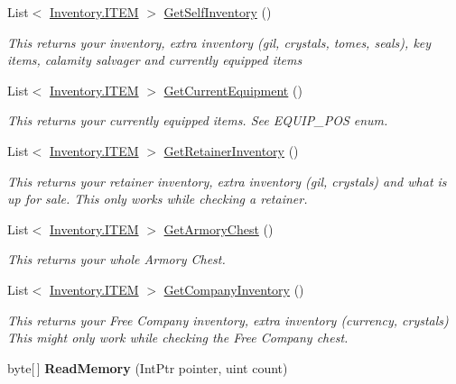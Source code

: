 \begin{DoxyCompactItemize}
List$<$ \hyperlink{structffxivlib_1_1_inventory_1_1_i_t_e_m}{Inventory.\-I\-T\-E\-M} $>$ \hyperlink{classffxivlib_1_1_f_f_x_i_v_l_i_b_a414e7d6cf920df6a210b28979d4e256b}{Get\-Self\-Inventory} ()
\begin{DoxyCompactList}\small\item\em This returns your inventory, extra inventory (gil, crystals, tomes, seals), key items, calamity salvager and currently equipped items \end{DoxyCompactList}\item 
List$<$ \hyperlink{structffxivlib_1_1_inventory_1_1_i_t_e_m}{Inventory.\-I\-T\-E\-M} $>$ \hyperlink{classffxivlib_1_1_f_f_x_i_v_l_i_b_a4ad97fc36d32d6c56d1ea7c12b5b211e}{Get\-Current\-Equipment} ()
\begin{DoxyCompactList}\small\item\em This returns your currently equipped items. See E\-Q\-U\-I\-P\-\_\-\-P\-O\-S enum. \end{DoxyCompactList}\item 
List$<$ \hyperlink{structffxivlib_1_1_inventory_1_1_i_t_e_m}{Inventory.\-I\-T\-E\-M} $>$ \hyperlink{classffxivlib_1_1_f_f_x_i_v_l_i_b_ae3c5c77d26ed45d4be8ddd8e0caf3bb9}{Get\-Retainer\-Inventory} ()
\begin{DoxyCompactList}\small\item\em This returns your retainer inventory, extra inventory (gil, crystals) and what is up for sale. This only works while checking a retainer. \end{DoxyCompactList}\item 
List$<$ \hyperlink{structffxivlib_1_1_inventory_1_1_i_t_e_m}{Inventory.\-I\-T\-E\-M} $>$ \hyperlink{classffxivlib_1_1_f_f_x_i_v_l_i_b_a1b51a968a6d6e59d5a0a3b265d19a742}{Get\-Armory\-Chest} ()
\begin{DoxyCompactList}\small\item\em This returns your whole Armory Chest. \end{DoxyCompactList}\item 
List$<$ \hyperlink{structffxivlib_1_1_inventory_1_1_i_t_e_m}{Inventory.\-I\-T\-E\-M} $>$ \hyperlink{classffxivlib_1_1_f_f_x_i_v_l_i_b_a9e3b1f4f0b1c203583e6c38a5bcf9c0c}{Get\-Company\-Inventory} ()
\begin{DoxyCompactList}\small\item\em This returns your Free Company inventory, extra inventory (currency, crystals) This might only work while checking the Free Company chest. \end{DoxyCompactList}\item 
\hypertarget{classffxivlib_1_1_f_f_x_i_v_l_i_b_a2e19fa6a85db14f2b15ff4038a33cd61}{byte\mbox{[}$\,$\mbox{]} {\bfseries Read\-Memory} (Int\-Ptr pointer, uint count)}\label{classffxivlib_1_1_f_f_x_i_v_l_i_b_a2e19fa6a85db14f2b15ff4038a33cd61}


\end{DoxyCompactItemize}
